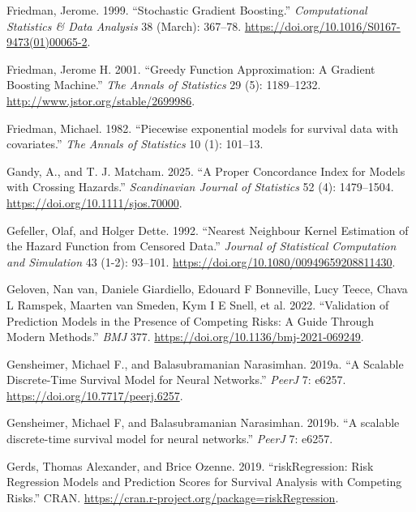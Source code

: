 \documentclass[
  letterpaper,
  krantz2]{style/krantz}
\newlength{\cslhangindent}
\newenvironment{CSLReferences}[2] %
 {\begin{list}{}{%
  \setlength{\itemindent}{0pt}
  \setlength{\leftmargin}{0pt}
  \setlength{\parsep}{0pt}
  \ifodd #1
   \setlength{\leftmargin}{\cslhangindent}
   \setlength{\itemindent}{-1\cslhangindent}
  \fi
  \setlength{\itemsep}{#2\baselineskip}}}
 {\end{list}}
\begin{document}
\begin{CSLReferences}{1}{0}
Friedman, Jerome. 1999. {``{Stochastic Gradient Boosting}.''}
\emph{Computational Statistics \& Data Analysis} 38 (March): 367--78.
\url{https://doi.org/10.1016/S0167-9473(01)00065-2}.

Friedman, Jerome H. 2001. {``{Greedy Function Approximation: A Gradient
Boosting Machine}.''} \emph{The Annals of Statistics} 29 (5):
1189--1232. \url{http://www.jstor.org/stable/2699986}.

Friedman, Michael. 1982. {``{Piecewise exponential models for survival
data with covariates}.''} \emph{The Annals of Statistics} 10 (1):
101--13.

Gandy, A., and T. J. Matcham. 2025. {``A Proper Concordance Index for
Models with Crossing Hazards.''} \emph{Scandinavian Journal of
Statistics} 52 (4): 1479--1504.
\url{https://doi.org/10.1111/sjos.70000}.

Gefeller, Olaf, and Holger Dette. 1992. {``Nearest Neighbour Kernel
Estimation of the Hazard Function from Censored Data.''} \emph{Journal
of Statistical Computation and Simulation} 43 (1-2): 93--101.
\url{https://doi.org/10.1080/00949659208811430}.

Geloven, Nan van, Daniele Giardiello, Edouard F Bonneville, Lucy Teece,
Chava L Ramspek, Maarten van Smeden, Kym I E Snell, et al. 2022.
{``Validation of Prediction Models in the Presence of Competing Risks: A
Guide Through Modern Methods.''} \emph{BMJ} 377.
\url{https://doi.org/10.1136/bmj-2021-069249}.

Gensheimer, Michael F., and Balasubramanian Narasimhan. 2019a. {``A
Scalable Discrete-Time Survival Model for Neural Networks.''}
\emph{PeerJ} 7: e6257. \url{https://doi.org/10.7717/peerj.6257}.

Gensheimer, Michael F, and Balasubramanian Narasimhan. 2019b. {``{A
scalable discrete-time survival model for neural networks}.''}
\emph{PeerJ} 7: e6257.

Gerds, Thomas Alexander, and Brice Ozenne. 2019. {``{riskRegression:
Risk Regression Models and Prediction Scores for Survival Analysis with
Competing Risks}.''} CRAN.
\url{https://cran.r-project.org/package=riskRegression}.


\end{CSLReferences}
\end{document}
